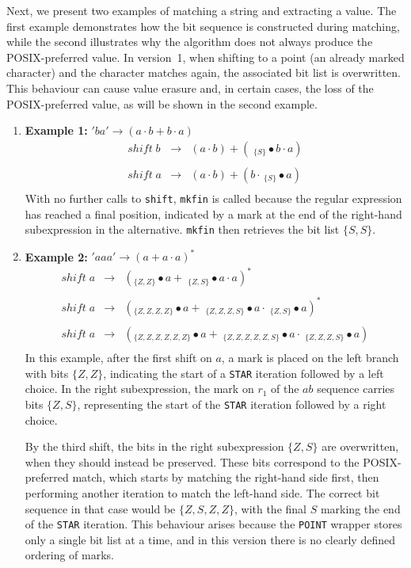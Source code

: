 \documentclass[12pt]{article}
\begin{document}
Next, we present two examples of matching a string and extracting a value.  
The first example demonstrates how the bit sequence is constructed during matching,  
while the second illustrates why the algorithm does not always produce the POSIX-preferred value.  
In version~1, when shifting to a point (an already marked character) and the character matches again,  
the associated bit list is overwritten.  
This behaviour can cause value erasure and, in certain cases, the loss of the POSIX-preferred value,  
as will be shown in the second example.


\begin{enumerate}
  \item \textbf{Example 1:} $'ba' \rightarrow (a \cdot b + b \cdot a)$
  \[
    \begin{array}{rcl}
      shift \; b & \rightarrow & (a \cdot b) + (\;_{\{S\}} \bullet b \cdot a)\\\\
      shift \; a & \rightarrow & (a \cdot b) + (b \cdot \,_{\{S\}} \bullet a)\\
    \end{array}
  \]
  With no further calls to \texttt{shift}, \texttt{mkfin} is called because the regular expression 
  has reached a final position, indicated by a mark at the end of the right-hand subexpression in 
  the alternative. \texttt{mkfin} then retrieves the bit list $\{S,S\}$.

  \item \textbf{Example 2:} $'aaa' \rightarrow (a + a \cdot a)^*$
  \[
    \begin{array}{rcl}
      shift \; a & \rightarrow & (_{\{Z,Z\}} \bullet a + \;_{\{Z,S\}} \bullet a \cdot a)^*\\\\
      shift \; a & \rightarrow & (_{\{Z,Z,Z,Z\}} \bullet a + \;_{\{Z,Z,Z,S\}} \bullet a \cdot \;_{\{Z,S\}} \bullet a)^*\\\\
      shift \; a & \rightarrow & (_{\{Z,Z,Z,Z,Z,Z\}} \bullet a + \;_{\{Z,Z,Z,Z,Z,S\}} \bullet a \cdot \;_{\{Z,Z,Z,S\}} \bullet a)\\
    \end{array}
  \]
  In this example, after the first shift on $a$, a mark is placed on the left branch with bits $\{Z,Z\}$,
  indicating the start of a \texttt{STAR} iteration followed by a left choice. In the right subexpression,
  the mark on $r_1$ of the $a b$ sequence carries bits $\{Z,S\}$, representing the start of the \texttt{STAR}
  iteration followed by a right choice. 
  
  
  \indent By the third shift, the bits in the right subexpression $\{Z,S\}$ are overwritten, when they should 
  instead be preserved. These bits correspond to the POSIX-preferred match, which starts by matching the 
  right-hand side first, then performing another iteration to match the left-hand side. The correct bit sequence
   in that case would be $\{Z,S,Z,Z\}$, with the final $S$ marking the end of the \texttt{STAR} iteration. This 
   behaviour arises because the \texttt{POINT} wrapper stores only a single bit list at a time, and in this version
    there is no clearly defined ordering of marks.

\end{enumerate}
\end{document}
